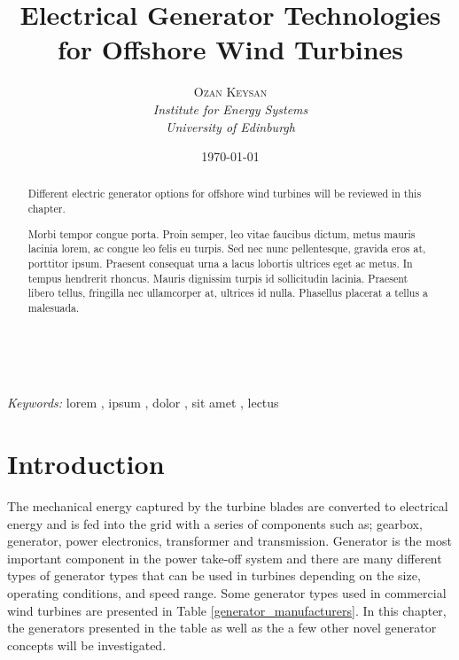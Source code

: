 \documentclass[a4paper, 11pt]{article} %
\title{\textbf{Electrical Generator Technologies for Offshore Wind Turbines}} %
\author{\textsc{Ozan Keysan} %
\\{\textit{Institute for Energy  Systems\\ University of Edinburgh}}} %
\date{\today} %
\makeatletter
\renewcommand{\maketitle}{ %
\begin{flushright} %
{\LARGE\@title} %

\vspace{50pt} %

{\large\@author} %
\\\@date %

\vspace{40pt} %
\end{flushright}
}
\makeatother
\begin{document}
\maketitle %



\begin{abstract}

Different electric generator options for offshore wind turbines will be reviewed in this chapter.

Morbi tempor congue porta. Proin semper, leo vitae faucibus dictum, metus mauris lacinia lorem, ac congue leo felis eu turpis. Sed nec nunc pellentesque, gravida eros at, porttitor ipsum. Praesent consequat urna a lacus lobortis ultrices eget ac metus. In tempus hendrerit rhoncus. Mauris dignissim turpis id sollicitudin lacinia. Praesent libero tellus, fringilla nec ullamcorper at, ultrices id nulla. Phasellus placerat a tellus a malesuada.
\end{abstract}

\hspace*{3,6mm}\textit{Keywords:} lorem , ipsum , dolor , sit amet , lectus %

\vspace{30pt} %


\section*{Introduction}


The mechanical energy captured by the turbine blades are converted to electrical energy and is fed into the grid with a series of components such as; gearbox, generator, power electronics, transformer and transmission. Generator is the most important component in the power take-off system and there are many different types of generator types that can be used in turbines depending on the size, operating conditions, and speed range. Some generator types used in commercial wind turbines are presented in Table \ref{generator_manufacturers}. In this chapter,  the generators presented in the table as well as the a few other novel generator concepts will be investigated.
\end{document}
